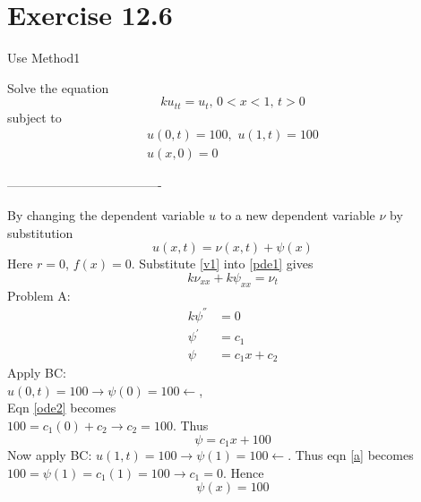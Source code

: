 \section{Exercise 12.6}
\begin{prob}
Use Method1
\end{prob}
Solve the equation 
\begin{equation}
ku_{tt}=u_t,\,0<x<1,\,t>0\label{pde1}
\end{equation}
 subject to
\begin{align*}
u(0,t)=100,\,\,u(1,t)=100\\
u(x,0)=0
\end{align*}
\begin{center}-------------------------------------\end{center}
\begin{sop}
\end{sop}
By changing the dependent variable $u$ to a new dependent variable $\nu$ by substitution 
\begin{equation}
u(x,t)=\nu(x,t)+\psi(x)\label{v1}
\end{equation}
Here $r=0$, $f(x)=0$.
Substitute \eqref{v1} into \eqref{pde1} gives
\begin{equation}
k\nu_{xx}+k\psi_{xx}=\nu_t\label{pde2}
\end{equation}
Problem A:
\begin{align}
k\psi^{''}&=0\label{ode1}\\
\psi^{'}&=c_1\nonumber\\
\psi&=c_1x+c_2\label{ode2}
\end{align}
Apply BC: \\
$u(0,t)=100\to \psi(0)=100\leftarrow$,\\
Eqn \eqref{ode2} becomes\\
$100=c_1(0)+c_2\to c_2=100$. Thus\\
\begin{equation}
\psi=c_1x+100\label{a}
\end{equation}
Now apply BC: $u(1,t)=100\to\psi(1)=100\leftarrow$. Thus eqn \eqref{a} becomes\\
$100=\psi(1)=c_1(1)=100\to c_1=0$. Hence\\
\begin{equation}
\psi(x)=100\label{b}
\end{equation}
